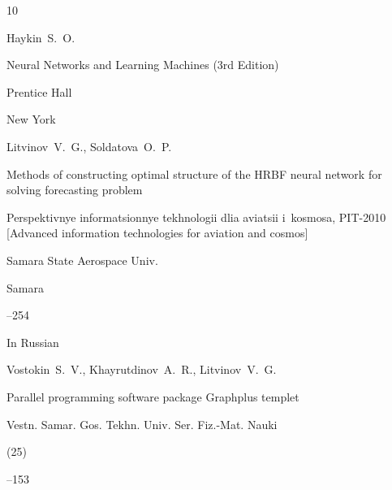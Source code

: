 \begin{thebibliography}{10}









\by Haykin~S.~O.

\book Neural Networks and Learning Machines \rm (3rd Edition)

\publ Prentice Hall


\publ New York 









\by Litvinov~V.~G., Soldatova~O.~P.

\paper Methods of constructing optimal structure of the HRBF neural network for solving forecasting problem

\inbook Perspektivnye informatsionnye tekhnologii dlia aviatsii i~kosmosa, \rm PIT-2010 [Advanced information technologies for aviation and cosmos]

\publaddr Samara State Aerospace Univ.

\publ Samara


--254










\lang In Russian

\by Vostokin~S.~V., Khayrutdinov~A.~R., Litvinov~V.~G.

\paper Parallel programming software package Graphplus templet

\jour Vestn. Samar. Gos. Tekhn. Univ. Ser. Fiz.-Mat. Nauki


(25)

--153











\end{thebibliography}
